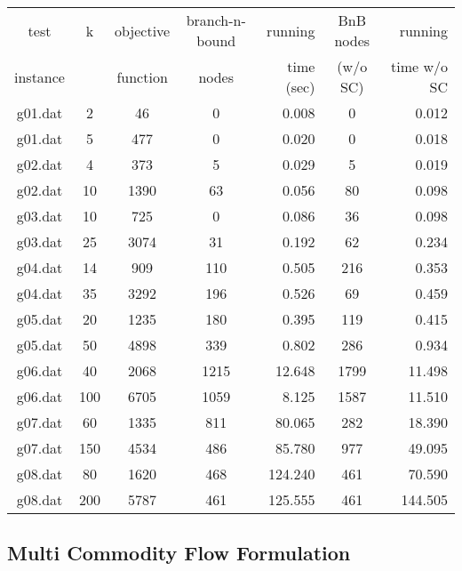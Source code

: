 \documentclass[,%
			paper=a4,%
			DIV14,
			liststotoc,
			bibtotoc,
			draft=false,%
			numbers=noendperiod
			]{scrartcl}
\begin{document}
\begin{tabular}{||c||cccr|cr||}
\hline
test     & k & objective  & branch-n-bound & running   & BnB nodes & running\\
instance &   & function   & nodes          & time (sec)& (w/o SC)  & time w/o SC \\
\hline
g01.dat	&	2	&	46	&	0	&	0.008	&	0	&	0.012	\\
g01.dat	&	5	&	477	&	0	&	0.020	&	0	&	0.018	\\
g02.dat	&	4	&	373	&	5	&	0.029	&	5	&	0.019	\\
g02.dat	&	10	&	1390	&	63	&	0.056	&	80	&	0.098	\\
g03.dat	&	10	&	725	&	0	&	0.086	&	36	&	0.098	\\
g03.dat	&	25	&	3074	&	31	&	0.192	&	62	&	0.234	\\
g04.dat	&	14	&	909	&	110	&	0.505	&	216	&	0.353	\\
g04.dat	&	35	&	3292	&	196	&	0.526	&	69	&	0.459	\\
g05.dat	&	20	&	1235	&	180	&	0.395	&	119	&	0.415	\\
g05.dat	&	50	&	4898	&	339	&	0.802	&	286	&	0.934	\\
g06.dat	&	40	&	2068	&	1215	&	12.648	&	1799	&	11.498	\\
g06.dat	&	100	&	6705	&	1059	&	8.125	&	1587	&	11.510	\\
g07.dat	&	60	&	1335	&	811	&	80.065	&	282	&	18.390	\\
g07.dat	&	150	&	4534	&	486	&	85.780	&	977	&	49.095	\\
g08.dat	&	80	&	1620	&	468	&	124.240	&	461	&	70.590	\\
g08.dat	&	200	&	5787	&	461	&	125.555	&	461	&	144.505	\\
\hline
\end{tabular}


\subsection{Multi Commodity Flow Formulation}
\end{document}
